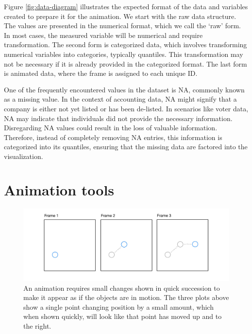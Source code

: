 Figure \ref{fig:data-diagram} illustrates the expected format of the data and variables created to prepare it for the animation. We start with the raw data structure. The values are presented in the numerical format, which we call the `raw' form. In most cases, the measured variable will be numerical and require transformation. The second form is categorized data, which involves transforming numerical variables into categories, typically quantiles. This transformation may not be necessary if it is already provided in the categorized format. The last form is animated data, where the frame is assigned to each unique ID.

One of the frequently encountered values in the dataset is NA, commonly known as a missing value. In the context of accounting data, NA might signify that a company is either not yet listed or has been de-listed. In scenarios like voter data, NA may indicate that individuals did not provide the necessary information. Disregarding NA values could result in the loss of valuable information. Therefore, instead of completely removing NA entries, this information is categorized into its quantiles, ensuring that the missing data are factored into the visualization.

\hypertarget{animation}{%
\section{Animation tools}\label{animation}}

\begin{figure}

{\centering \includegraphics[width=1\linewidth]{figures/animation-diagram} 

}

\caption{An animation requires small changes shown in quick succession to make it appear as if the objects are in motion. The three plots above show a single point changing position by a small amount, which when shown quickly, will look like that point has moved up and to the right.}\label{fig:animation-diagram}
\end{figure}

